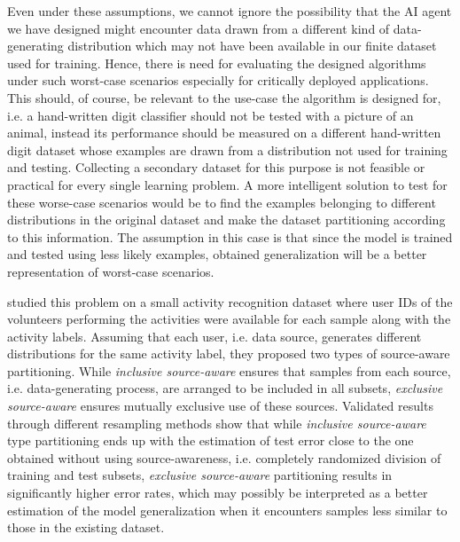 \documentclass[letterpaper]{article}
\begin{document}
Even under these assumptions, we cannot ignore the possibility that the AI agent we have designed might encounter data drawn from a different kind of data-generating distribution which may not have been available in our finite dataset used for training. Hence, there is need for evaluating the designed algorithms under such worst-case scenarios especially for critically deployed applications. This should, of course, be relevant to the use-case the algorithm is designed for, i.e. a hand-written digit classifier should not be tested with a picture of an animal, instead its performance should be measured on a different hand-written digit dataset whose examples are drawn from a distribution not used for training and testing. Collecting a secondary dataset for this purpose is not feasible or practical for every single learning problem. A more intelligent solution to test for these worse-case scenarios would be to find the examples belonging to different distributions in the original dataset and make the dataset partitioning according to this information. The assumption in this case is that since the model is trained and tested using less likely examples, obtained generalization will be a better representation of worst-case scenarios. 

\cite{KilincU15} studied this problem on a small activity recognition dataset where user IDs of the volunteers performing the activities were available for each sample along with the activity labels. Assuming that each user, i.e. data source, generates different distributions for the same activity label, they proposed two types of source-aware partitioning. While \textit{inclusive source-aware} ensures that samples from each source, i.e. data-generating process, are arranged to be included in all subsets, \textit{exclusive source-aware} ensures mutually exclusive use of these sources. Validated results through different resampling methods show that while \textit{inclusive source-aware} type partitioning ends up with the estimation of test error close to the one obtained without using source-awareness, i.e. completely randomized division of training and test subsets, \textit{exclusive source-aware} partitioning results in significantly higher error rates, which may possibly be interpreted as a better estimation of the model generalization when it encounters samples less similar to those in the existing dataset.
\end{document}
